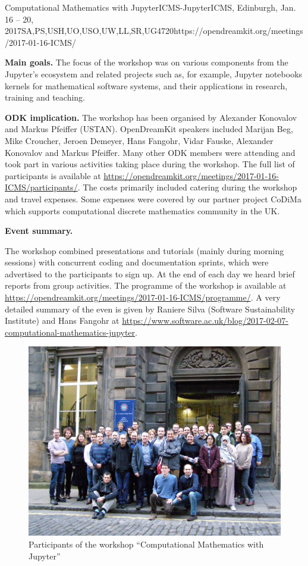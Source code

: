 \begin{event}{Computational Mathematics with Jupyter}{ICMS-Jupyter}{ICMS, Edinburgh, Jan. 16 -- 20, 2017}{SA,PS,USH,UO,USO,UW,LL,SR,UG}{47}{20}{https://opendreamkit.org/meetings/2017-01-16-ICMS/}

\textbf{Main goals.} The focus of the workshop was on various components from the Jupyter's ecosystem 
and related projects such as, for example, Jupyter notebooks kernels for mathematical software systems,
and their applications in research, training and teaching.

\textbf{ODK implication.} The workshop has been organised by Alexander Konovalov and Markus
Pfeiffer (USTAN). OpenDreamKit speakers included Marijan Beg, Mike Croucher, Jeroen Demeyer,
Hans Fangohr, Vidar Fauske, Alexander Konovalov and Markus Pfeiffer. Many other ODK members
were attending and took part in various activities taking place during the workshop.
The full list of participants is available at
\url{https://opendreamkit.org/meetings/2017-01-16-ICMS/participants/}.
The costs primarily included catering during the workshop and travel expenses.
Some expenses were covered by our partner project CoDiMa which supports computational
discrete mathematics community in the UK.

\textbf{Event summary.}

The workshop combined presentations and tutorials (mainly during morning sessions)
with concurrent coding and documentation sprints, which were advertised to the participants
to sign up. At the end of each day we heard brief reports from group activities.
The programme of the workshop is available
at \url{https://opendreamkit.org/meetings/2017-01-16-ICMS/programme/}. A very detailed
summary of the even is given by Raniere Silva (Software Sustainability Institute) and
Hans Fangohr at \url{https://www.software.ac.uk/blog/2017-02-07-computational-mathematics-jupyter}.

\begin{figure}[ht]
\includegraphics[scale=.14]{ICMS_Jan2017.jpg}
\caption*{Participants of the workshop ``Computational Mathematics with Jupyter''}
\end{figure}

\end{event}